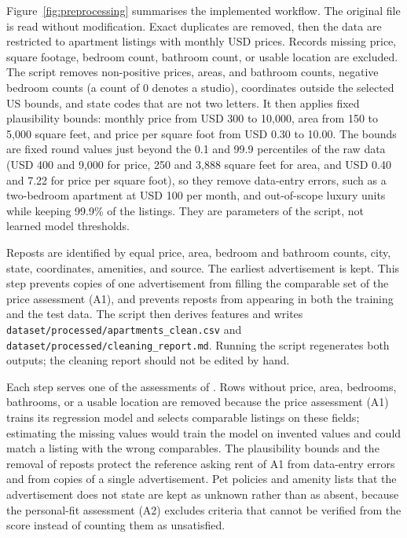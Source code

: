 \documentclass[12pt,a4paper]{report}
\begin{document}
Figure~\ref{fig:preprocessing} summarises the implemented workflow. The
original file is read without modification. Exact duplicates are removed,
then the data are restricted to apartment listings with monthly USD prices.
Records missing price, square footage, bedroom count, bathroom count, or
usable location are excluded. The script removes non-positive prices, areas,
and bathroom counts, negative bedroom counts (a count of 0 denotes a
studio), coordinates outside the selected US bounds, and state codes that
are not two letters. It then applies fixed plausibility bounds: monthly price from USD
300 to 10,000, area from 150 to 5,000 square feet, and price per square foot
from USD 0.30 to 10.00. The bounds are fixed round values just beyond the
0.1 and 99.9 percentiles of the raw data (USD 400 and 9,000 for price, 250
and 3,888 square feet for area, and USD 0.40 and 7.22 for price per square
foot), so they remove data-entry errors, such as a two-bedroom apartment at
USD 100 per month, and out-of-scope luxury units while keeping 99.9\% of the
listings. They are parameters of the script, not learned model thresholds.

Reposts are identified by equal price, area, bedroom and bathroom counts,
city, state, coordinates, amenities, and source. The earliest advertisement
is kept. This step prevents copies of one advertisement from filling the
comparable set of the price assessment (A1), and prevents reposts from
appearing in both the training and the test data. The script then derives
features and writes \nolinkurl{dataset/processed/apartments_clean.csv} and
\nolinkurl{dataset/processed/cleaning_report.md}. Running the script regenerates
both outputs; the cleaning report should not be edited by hand.

Each step serves one of the assessments of . Rows
without price, area, bedrooms, bathrooms, or a usable location are removed
because the price assessment (A1) trains its regression model and selects
comparable listings on these fields; estimating the missing values would
train the model on invented values and could match a listing with the
wrong comparables. The plausibility
bounds and the removal of reposts protect the reference asking rent of A1
from data-entry errors and from copies of a single advertisement. Pet
policies and amenity lists that the advertisement does not state are kept
as unknown rather than as absent, because the personal-fit assessment (A2)
excludes criteria that cannot be verified from the score instead of
counting them as unsatisfied.
\end{document}
